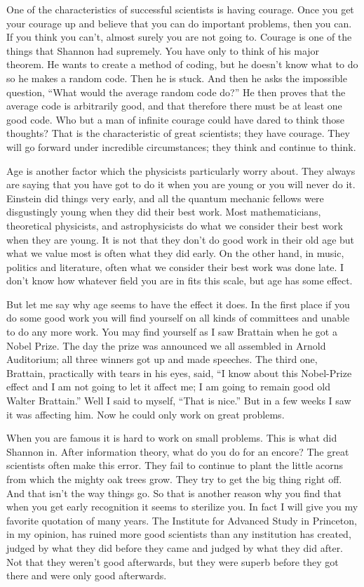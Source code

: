 \documentclass{article}
\begin{document}
One of the characteristics of successful scientists is having courage. Once you get your courage up and believe that you can do important problems, then you can. If you think you can't, almost surely you are not going to. Courage is one of the things that Shannon had supremely. You have only to think of his major theorem. He wants to create a method of coding, but he doesn't know what to do so he makes a random code. Then he is stuck. And then he asks the impossible question, ``What would the average random code do?'' He then proves that the average code is arbitrarily good, and that therefore there must be at least one good code. Who but a man of infinite courage could have dared to think those thoughts? That is the characteristic of great scientists; they have courage. They will go forward under incredible circumstances; they think and continue to think.

Age is another factor which the physicists particularly worry about. They always are saying that you have got to do it when you are young or you will never do it. Einstein did things very early, and all the quantum mechanic fellows were disgustingly young when they did their best work. Most mathematicians, theoretical physicists, and astrophysicists do what we consider their best work when they are young. It is not that they don't do good work in their old age but what we value most is often what they did early. On the other hand, in music, politics and literature, often what we consider their best work was done late. I don't know how whatever field you are in fits this scale, but age has some effect.

But let me say why age seems to have the effect it does. In the first place if you do some good work you will find yourself on all kinds of committees and unable to do any more work. You may find yourself as I saw Brattain when he got a Nobel Prize. The day the prize was announced we all assembled in Arnold Auditorium; all three winners got up and made speeches. The third one, Brattain, practically with tears in his eyes, said, ``I know about this Nobel-Prize effect and I am not going to let it affect me; I am going to remain good old Walter Brattain.'' Well I said to myself, ``That is nice.'' But in a few weeks I saw it was affecting him. Now he could only work on great problems.

When you are famous it is hard to work on small problems. This is what did Shannon in. After information theory, what do you do for an encore? The great scientists often make this error. They fail to continue to plant the little acorns from which the mighty oak trees grow. They try to get the big thing right off. And that isn't the way things go. So that is another reason why you find that when you get early recognition it seems to sterilize you. In fact I will give you my favorite quotation of many years. The Institute for Advanced Study in Princeton, in my opinion, has ruined more good scientists than any institution has created, judged by what they did before they came and judged by what they did after. Not that they weren't good afterwards, but they were superb before they got there and were only good afterwards.
\end{document}
